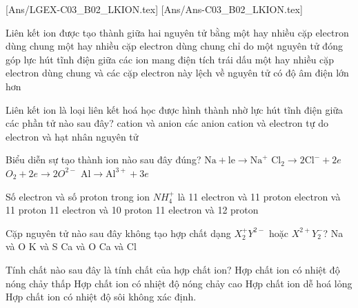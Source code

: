 [Ans/LGEX-C03_B02_LKION.tex]
[Ans/Ans-C03_B02_LKION.tex]
\begin{ex}
	Liên kết ion được tạo thành giữa hai nguyên tử bằng
	\choice
	{một hay nhiều cặp electron dùng chung}
	{một hay nhiều cặp electron dùng chung chỉ do một nguyên tử đóng góp}
	{\True lực hút tĩnh điện giữa các ion mang điện tích trái dấu}
	{một hay nhiều cặp electron dùng chung và các cặp electron này lệch về nguyên tử có độ âm điện lớn hơn}
	\loigiai{}
\end{ex}

\begin{ex}
	Liên kết ion là loại liên kết hoá học được hình thành nhờ lực hút tĩnh điện giữa các phần tử nào sau đây?
	\choice
	{\True cation và anion}
	{các anion}
	{cation và electron tự do}
	{electron và hạt nhân nguyên tử}
	\loigiai{}
\end{ex}

\begin{ex}
	Biểu diễn sự tạo thành ion nào sau đây đúng?
	\choice
	{$\mathrm{Na}+\mathrm{le} \to \mathrm{Na}^{+}$}
	{$\mathrm{Cl}_2\to 2\mathrm{Cl}^{-}+2e$}
	{$O_2+2e \to 2O^{2-}$}
	{\True $\mathrm{Al} \to \mathrm{Al}^{3+}+3e$}
	\loigiai{}
\end{ex}

\begin{ex}
	Số electron và số proton trong ion $NH_4^{+}$ là
	\choice
	{11 electron và 11 proton}
	{ electron và 11 proton}
	{11 electron và 10 proton}
	{11 electron và 12 proton}
	\loigiai{}
\end{ex}

\begin{ex}
	Cặp nguyên tử nào sau đây không tạo hợp chất dạng $X_2^{+} Y^{2-}$ hoặc $X^{2+} Y_2^{-}$?
	\choice
	{Na và O}
	{K và S}
	{\True Ca và O}
	{Ca và Cl}
	\loigiai{}
\end{ex}

\begin{ex}
	Tính chất nào sau đây là tính chất của hợp chất ion?
	\choice
	{Hợp chất ion có nhiệt độ nóng chảy thấp}
	{\True Hợp chất ion có nhiệt độ nóng chảy cao}
	{Hợp chất ion dễ hoá lỏng}
	{Hợp chất ion có nhiệt độ sôi không xác định.}
	\loigiai{}
	\end{ex}
	
